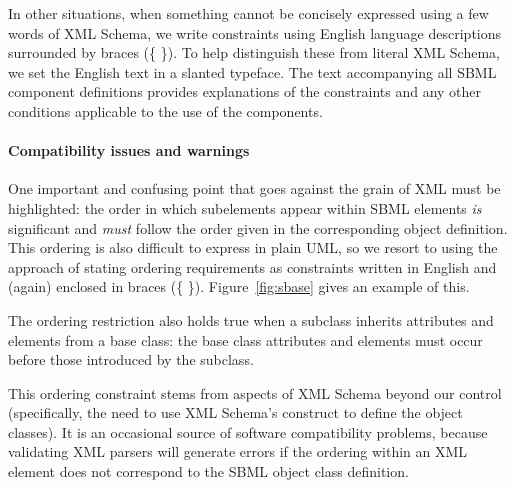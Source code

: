 \begin{blockChanged}
In other situations, when something cannot be concisely expressed
using a few words of XML Schema, we write constraints using
English language descriptions surrounded by braces (\{ \}).  To
help distinguish these from literal XML Schema, we set the English
text in a slanted typeface.  The text accompanying all SBML
component definitions provides explanations of the constraints and
any other conditions applicable to the use of the components.


\paragraph{Compatibility issues and warnings}

One important and confusing point that goes against the grain of
XML must be highlighted: the order in which subelements appear
within SBML elements \emph{is} significant and \emph{must} follow
the order given in the corresponding object definition.  This
ordering is also difficult to express in plain UML, so we resort
to using the approach of stating ordering requirements as
constraints written in English and (again) enclosed in
braces (\{ \}).  Figure~\vref{fig:sbase} gives an example of this.

The ordering restriction also holds true when a subclass inherits
attributes and elements from a base class: the base class
attributes and elements must occur before those introduced by the
subclass.

This ordering constraint stems from aspects of XML Schema beyond
our control (specifically, the need to use XML Schema's
 construct to define the object classes).  It is
an occasional source of software compatibility problems, because
validating XML parsers will generate errors if the ordering
within an XML element does not correspond to the SBML object class
definition.


\end{blockChanged}
